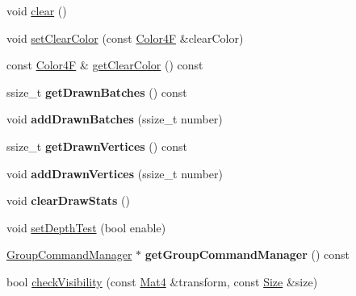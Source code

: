 \begin{DoxyCompactItemize}
\item 
void \hyperlink{classRenderer_ac46720b3fc0dbb2fc37674766490a8c4}{clear} ()
\item 
void \hyperlink{classRenderer_ac098692bd1bad4e15176c9a95c6e1183}{set\+Clear\+Color} (const \hyperlink{structColor4F}{Color4F} \&clear\+Color)
\item 
const \hyperlink{structColor4F}{Color4F} \& \hyperlink{classRenderer_a3d8ae93f3fe70fd6f76d9f9a951d2161}{get\+Clear\+Color} () const
\item 
\mbox{\label{classRenderer_a14abb8eac3312b713482bfc9c29c02e8}} 
ssize\+\_\+t {\bfseries get\+Drawn\+Batches} () const
\item 
\mbox{\label{classRenderer_a3c833a68b2980d4a553dca5e86a8984c}} 
void {\bfseries add\+Drawn\+Batches} (ssize\+\_\+t number)
\item 
\mbox{\label{classRenderer_acb6393c935dc8634a5144ae05571577c}} 
ssize\+\_\+t {\bfseries get\+Drawn\+Vertices} () const
\item 
\mbox{\label{classRenderer_a1bb1dbcc8c83b7fc0652d8fafa0a924a}} 
void {\bfseries add\+Drawn\+Vertices} (ssize\+\_\+t number)
\item 
\mbox{\label{classRenderer_a79e7e34a4d1d1c03f10dda28395597a4}} 
void {\bfseries clear\+Draw\+Stats} ()
\item 
void \hyperlink{classRenderer_a6d81add581a355d8da31c51702f398d4}{set\+Depth\+Test} (bool enable)
\item 
\mbox{\label{classRenderer_af9f29f3a34e57c05de86fc0f5416d579}} 
\hyperlink{classGroupCommandManager}{Group\+Command\+Manager} $\ast$ {\bfseries get\+Group\+Command\+Manager} () const
\item 
bool \hyperlink{classRenderer_a00f5f0b6bc05c02965d98dbfd5e4e0bb}{check\+Visibility} (const \hyperlink{classMat4}{Mat4} \&transform, const \hyperlink{classSize}{Size} \&size)
\end{DoxyCompactItemize}
